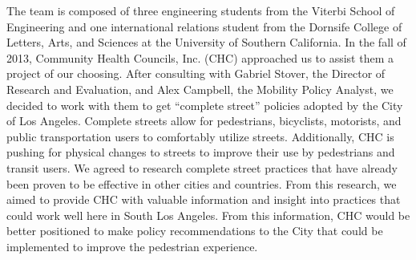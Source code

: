 The team is composed of three engineering students from the Viterbi School of Engineering and one international relations student from the Dornsife College of Letters, Arts, and Sciences at the University of Southern California.  In the fall of 2013, Community Health Councils, Inc. (CHC) approached us to assist them a project of our choosing.  After consulting with Gabriel Stover, the Director of Research and Evaluation, and Alex Campbell, the Mobility Policy Analyst, we decided to work with them to get ``complete street” policies adopted by the City of Los Angeles.  Complete streets allow for pedestrians, bicyclists, motorists, and public transportation users to comfortably utilize streets.  Additionally, CHC is pushing for physical changes to streets to improve their use by pedestrians and transit users.  We agreed to research complete street practices that have already been proven to be effective in other cities and countries.  From this research, we aimed to provide CHC with valuable information and insight into practices that could work well here in South Los Angeles.  From this information, CHC would be better positioned to make policy recommendations to the City that could be implemented to improve the pedestrian experience.